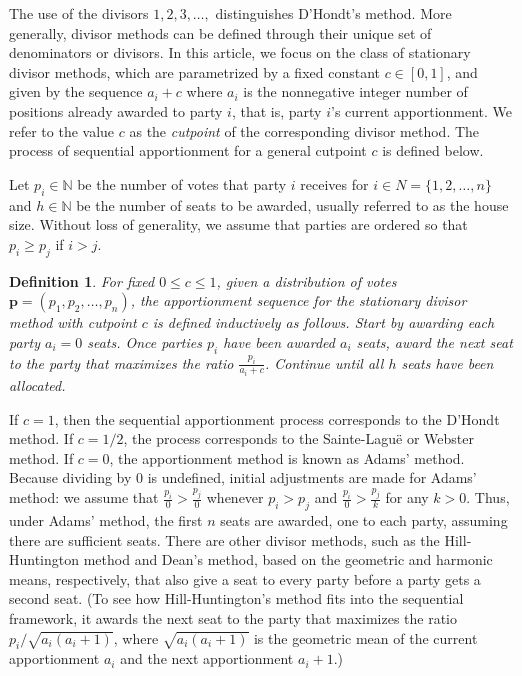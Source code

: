 \documentclass[pdflatex,sn-mathphys-num]{sn-jnl}
\theoremstyle{thmstyleone}%
\theoremstyle{thmstyletwo}%
\theoremstyle{thmstylethree}%
\newtheorem{definition}{Definition}%
\begin{document}
The use of the divisors  $1, 2, 3, \ldots, $  distinguishes D'Hondt's method. More generally, divisor methods can be defined through their unique set of denominators or divisors. In this article, we focus on the class of stationary divisor methods, which are parametrized by a fixed constant  $c \in [0, 1]$, and given by the sequence   $a_i+c$ where  $a_i$ is the nonnegative integer number of positions already awarded to party $i$, that is, party $i$'s current apportionment.   We refer to the value $c$ as the {\it cutpoint} of the corresponding divisor method. The process of sequential apportionment for a general cutpoint $c$ is defined below.  

Let $p_i \in \mathbb N$ be the number of votes that party $i$ receives for $i \in N = \{1, 2, \dots, n\}$ and $h \in \mathbb N$ be the number of seats to be awarded, usually referred to as the house size. Without loss of generality, we assume that parties are ordered so that  $p_i \ge p_j$ if $i > j$.  

 \begin{definition}
For fixed $0 \le c \le 1$, given a distribution of votes $\mathbf p=(p_1, p_2, \ldots, p_n)$, the apportionment sequence for the stationary divisor method with cutpoint $c$ is defined inductively as follows. Start by awarding each party  $a_i=0$ seats. Once parties $p_i$ have been awarded $a_i$ seats, award the next seat to the party that  maximizes the ratio $\frac{p_i}{a_i+c}$. Continue until all $h$ seats have been allocated.
\end{definition}

If $c=1$, then the sequential apportionment process corresponds to the D'Hondt method. If $c=1/2$, the process corresponds to the Sainte-Lagu\"{e} or Webster method. If $c=0$, the apportionment method is known as Adams' method.  Because dividing by $0$ is undefined, initial adjustments are made for Adams' method: we assume that $\frac{p_i}{0} > \frac{p_j}{0}$ whenever $p_i > p_j$ and $\frac{p_i}{0} > \frac{p_j}{k}$ for any $k > 0$. Thus, under Adams' method, the first $n$ seats are awarded, one to each party, assuming there are sufficient seats.  There are other divisor methods, such as the Hill-Huntington method and Dean's method, based on the geometric and harmonic means, respectively, that also give a seat to every party before a party gets a second seat.  (To see how Hill-Huntington's method fits into the sequential framework, it awards the next seat  to the party that maximizes the ratio $p_i/\sqrt{a_i(a_i+1)}$, where $\sqrt{a_i(a_i+1)}$ is the geometric mean of the current apportionment $a_i$ and the next apportionment $a_i + 1$.)
\end{document}
